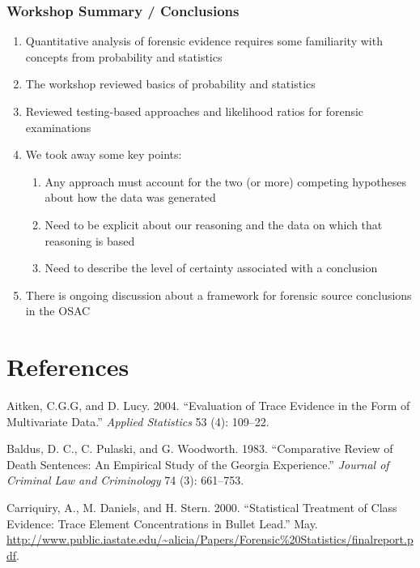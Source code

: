 \documentclass[]{book}
\providecommand{\tightlist}{%
  \setlength{\itemsep}{0pt}\setlength{\parskip}{0pt}}
\theoremstyle{definition}
\theoremstyle{definition}
\theoremstyle{remark}
\begin{document}
\subsection{Workshop Summary /
Conclusions}\label{workshop-summary-conclusions}

\begin{enumerate}
\def\labelenumi{\arabic{enumi}.}
\tightlist
\item
  Quantitative analysis of forensic evidence requires some familiarity
  with concepts from probability and statistics
\item
  The workshop reviewed basics of probability and statistics
\item
  Reviewed testing-based approaches and likelihood ratios for forensic
  examinations
\item
  We took away some key points:

  \begin{enumerate}
  \def\labelenumii{\alph{enumii}.}
  \tightlist
  \item
    Any approach must account for the two (or more) competing hypotheses
    about how the data was generated
  \item
    Need to be explicit about our reasoning and the data on which that
    reasoning is based
  \item
    Need to describe the level of certainty associated with a conclusion
  \end{enumerate}
\item
  There is ongoing discussion about a framework for forensic source
  conclusions in the OSAC
\end{enumerate}

\chapter*{References}\label{references}

\hypertarget{refs}{}
\hypertarget{ref-aitkenlucy}{}
Aitken, C.G.G, and D. Lucy. 2004. ``Evaluation of Trace Evidence in the
Form of Multivariate Data.'' \emph{Applied Statistics} 53 (4): 109--22.

\hypertarget{ref-baldus}{}
Baldus, D. C., C. Pulaski, and G. Woodworth. 1983. ``Comparative Review
of Death Sentences: An Empirical Study of the Georgia Experience.''
\emph{Journal of Criminal Law and Criminology} 74 (3): 661--753.

\hypertarget{ref-aliciaetal}{}
Carriquiry, A., M. Daniels, and H. Stern. 2000. ``Statistical Treatment
of Class Evidence: Trace Element Concentrations in Bullet Lead.'' May.
\url{http://www.public.iastate.edu/~alicia/Papers/Forensic\%20Statistics/finalreport.pdf}.
\end{document}
